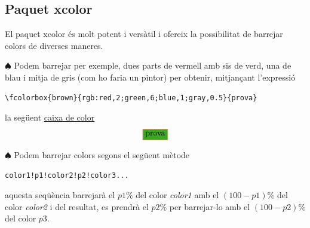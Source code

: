 \documentclass[a4paper,12pt]{article}
\begin{document}
\subsection{Paquet xcolor}
El paquet xcolor és molt potent i versàtil i ofereix la possibilitat de barrejar colors de diverses maneres. 
\bigskip

$\spadesuit$ Podem barrejar per exemple, dues parts de vermell amb sis de verd, una de blau i mitja de gris (com ho faria un pintor) per obtenir, mitjançant l'expressió

\begin{verbatim}
\fcolorbox{brown}{rgb:red,2;green,6;blue,1;gray,0.5}{prova}
\end{verbatim}
la següent \hyperref[sec:colorbox]{caixa de color}
$$
\fcolorbox{brown}{rgb:red,2;green,6;blue,1;gray,0.5}{prova}$$
\clearpage

$\spadesuit$ Podem barrejar colors segons el següent mètode
\begin{verbatim}
color1!p1!color2!p2!color3...
\end{verbatim}
aquesta seqüència barrejarà el $p1\%$ del color \emph{color1} amb el $(100-p1)\%$ del color \emph{color2} i del resultat, es prendrà el $p2\%$ per barrejar-lo amb el $(100-p2)\%$ del color $p3$.
\bigskip
\end{document}
